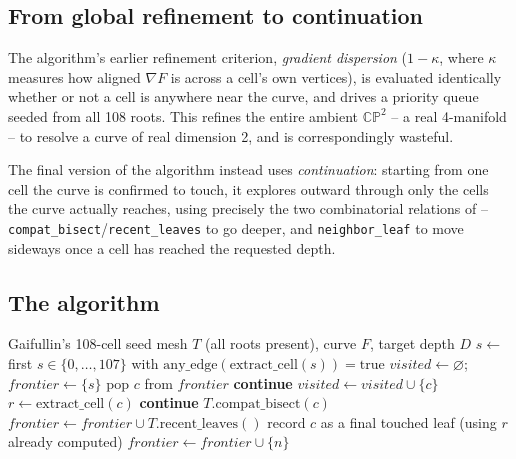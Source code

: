 \documentclass[11pt]{article}
\newcommand{\CP}{\mathbb{CP}}
\begin{document}
\subsection{From global refinement to continuation}

The algorithm's earlier refinement criterion, \emph{gradient dispersion}
($1-\kappa$, where $\kappa$ measures how aligned $\nabla F$ is across a
cell's own vertices), is evaluated identically whether or not a cell is
anywhere near the curve, and drives a priority queue seeded from all 108
roots. This refines the entire ambient $\CP^2$ -- a real 4-manifold -- to
resolve a curve of real dimension 2, and is correspondingly wasteful.

The final version of the algorithm instead uses \emph{continuation}:
starting from one cell the curve is confirmed to touch, it explores
outward through only the cells the curve actually reaches, using
precisely the two combinatorial relations of  --
\texttt{compat\_bisect}/\texttt{recent\_leaves} to go deeper, and
\texttt{neighbor\_leaf} to move sideways once a cell has reached the
requested depth.

\subsection{The algorithm}

\begin{algorithm}[H]
\caption{Continuation-based Riemann-surface triangulation (default Phase~1
of \texttt{riemann\_cp2\_glpt.cpp})}
\begin{algorithmic}[1]
\Require Gaifullin's 108-cell seed mesh $T$ (all roots present), curve $F$, target depth $D$
\State $s \gets$ first $s\in\{0,\dots,107\}$ with $\mathrm{any\_edge}(\mathrm{extract\_cell}(s))=\mathrm{true}$
\State $\mathit{visited}\gets\varnothing$; $\mathit{frontier}\gets\{s\}$
  \State pop $c$ from $\mathit{frontier}$
   \textbf{continue} 
  \EndIf
  \State $\mathit{visited}\gets\mathit{visited}\cup\{c\}$
  \State $r\gets\mathrm{extract\_cell}(c)$
   \textbf{continue} 
  \EndIf
    \State $T.\mathrm{compat\_bisect}(c)$
    \State $\mathit{frontier}\gets\mathit{frontier}\cup T.\mathrm{recent\_leaves}()$
  \Else
    \State record $c$ as a final touched leaf (using $r$ already computed)
        \State $\mathit{frontier}\gets\mathit{frontier}\cup\{n\}$
      \EndIf
    \EndFor
  \EndIf
\EndWhile
\end{algorithmic}
\end{algorithm}
\end{document}
